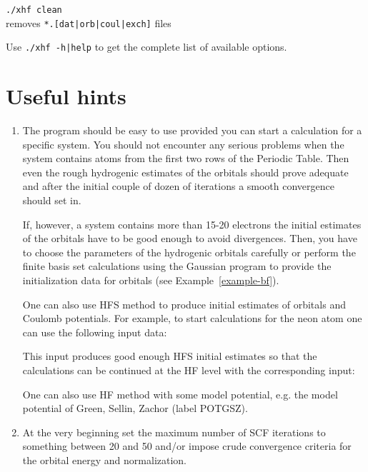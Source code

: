 \documentclass[12pt,a4paper]{article}
\newcommand{\ft}[1]{\texttt{#1}}
\begin{document}
\begin{description} 
\item \hspace*{0.5cm} \texttt{./xhf clean} \\ removes
  \texttt{*.[dat|orb|coul|exch]} files
\end{description} 

Use \ft{./xhf -h|help} to get the complete list of available options.

\section{Useful hints}

\begin{enumerate} 
\item The program should be easy to use provided you can start a calculation for a
  specific system. You should not encounter any serious problems when the system contains
  atoms from the first two rows of the Periodic Table. Then even the rough hydrogenic
  estimates of the orbitals should prove adequate and after the initial couple of dozen of
  iterations a smooth convergence should set in.

  If, however, a system contains more than 15-20 electrons the initial estimates of the
  orbitals have to be good enough to avoid divergences. Then, you have to choose the
  parameters of the hydrogenic orbitals carefully or perform the finite basis set
  calculations using the Gaussian program to provide the initialization data for orbitals
  (see Example~\ref{example-bf}).

  One can also use HFS method to produce initial estimates of orbitals and Coulomb
  potentials. For example, to start calculations for the neon atom one can use the
  following input data:

  

  This input produces good enough HFS initial estimates so that the calculations can be
  continued at the HF level with the corresponding input:

  

  One can also use HF method with some model potential, e.g. the model potential of Green,
  Sellin, Zachor (label POTGSZ).

\item At the very beginning set the maximum number of SCF iterations to something between
  20 and 50 and/or impose crude convergence criteria for the orbital energy and
  normalization.


\end{enumerate}
\end{document}
